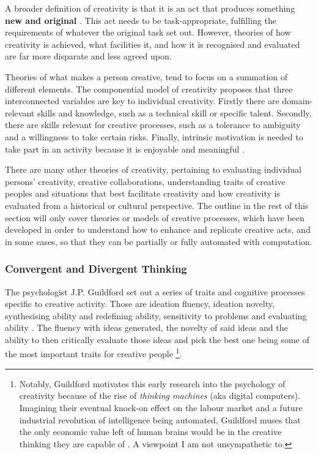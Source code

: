 A broader definition of creativity is that it is an act that produces something \textbf{new and original} \citep{kaufman2021overview}. This act needs to be task-appropriate, fulfilling the requirements of whatever the original task set out. 
However, theories of how creativity is achieved, what facilities it, and how it is recognised and evaluated are far more disparate and less agreed upon. 

Theories of what makes a person creative, tend to focus on a summation of different elements. 
The componential model of creativity proposes that three interconnected variables are key to individual creativity.
Firstly there are domain-relevant skills and knowledge, such as a technical skill or specific talent.
Secondly, there are skills relevant for creative processes, such as a tolerance to ambiguity and a willingness to take certain risks.
Finally, intrinsic motivation is needed to take part in an activity because it is enjoyable and meaningful \citep{amabile1983social}.

There are many other theories of creativity, pertaining to evaluating individual persons' creativity, creative collaborations, understanding traits of creative peoples and situations that best facilitate creativity and how creativity is evaluated from a historical or cultural perspective. 
The outline in the rest of this section will only cover theories or models of creative processes, which have been developed in order to understand how to enhance and replicate creative acts, and in some cases, so that they can be partially or fully automated with computation.

\subsubsection{Convergent and Divergent Thinking}

The psychologist J.P. Guildford set out a series of traits and cognitive processes specific to creative activity. Those are ideation fluency, ideation novelty, synthesising ability and redefining ability, sensitivity to problems and evaluating ability \citep{guilford1950creativity}. The fluency with ideas generated, the novelty of said ideas and the ability to then critically evaluate those ideas and pick the best one being some of the most important traits for creative people
\footnote{Notably, Guildford motivates this early research into the psychology of creativity because of the rise of \textit{thinking machines} (aka digital computers).
Imagining their eventual knock-on effect on the labour market and a future industrial revolution of intelligence being automated, Guildford muses that the only economic value left of human brains would be in the creative thinking they are capable of \citep{guilford1950creativity}. 
A viewpoint I am not unsympathetic to.}. 


